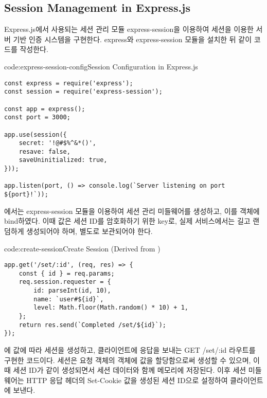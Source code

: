 
\subsection*{Session Management in Express.js}

Express.js에서 사용되는 세션 관리 모듈 express-session을 이용하여 세션을 이용한 서버 기반 인증 시스템을 구현한다. express와 express-session 모듈을 설치한 뒤 \와 같이 코드를 작성한다.

\begin{codeenv}{code:express-session-config}{Session Configuration in Express.js}\begin{verbatim}
const express = require('express');
const session = require('express-session');

const app = express();
const port = 3000;

app.use(session({
    secret: '!@#$%^&*()',
    resave: false,
    saveUninitialized: true,
}));

app.listen(port, () => console.log(`Server listening on port ${port}!`));
\end{verbatim}
\end{codeenv}

에서는 express-session 모듈을 이용하여 세션 관리 미들웨어를 생성하고, 이를  객체에 bind하였다. 이때  값은 세션 ID를 암호화하기 위한 key로, 실제 서비스에서는 길고 랜덤하게 생성되어야 하며, 별도로 보관되어야 한다.

\begin{codeenv}{code:create-session}{Create Session (Derived from )}\begin{verbatim}
app.get('/set/:id', (req, res) => {
    const { id } = req.params;
    req.session.requester = {
        id: parseInt(id, 10),
        name: `user#${id}`,
        level: Math.floor(Math.random() * 10) + 1,
    };
    return res.send(`Completed /set/${id}`);
});
\end{verbatim}
\end{codeenv}

\은 에  값에 따라 세션을 생성하고, 클라이언트에 응답을 보내는 GET /set/:id 라우트를 구현한 코드이다. 세션은 요청 객체의  객체에 값을 할당함으로써 생성할 수 있으며, 이때 세션 ID가 같이 생성되면서 세션 데이터와 함께 메모리에 저장된다. 이후 세션 미들웨어는 HTTP 응답 헤더의 Set-Cookie 값을 생성된 세션 ID으로 설정하여 클라이언트에 보낸다.

